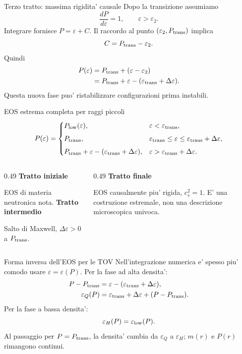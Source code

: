 \begin{frame}{Terzo tratto: massima rigidita' causale}
\small
Dopo la transizione assumiamo
\[
\frac{dP}{d\varepsilon}=1,
\qquad \varepsilon>\varepsilon_2.
\]
Integrare fornisce $P=\varepsilon+C$. Il raccordo al punto $(\varepsilon_2,P_{\rm trans})$ implica
\[
C=P_{\rm trans}-\varepsilon_2.
\]
Quindi
\[
\begin{aligned}
P(\varepsilon)
&=P_{\rm trans}+(\varepsilon-\varepsilon_2)\\
&=P_{\rm trans}+\varepsilon
  -(\varepsilon_{\rm trans}+\Delta\varepsilon).
\end{aligned}
\]
Questa nuova fase puo' ristabilizzare configurazioni prima instabili.
\end{frame}

\begin{frame}{EOS estrema completa per raggi piccoli}
\footnotesize
\[
P(\varepsilon)=
\begin{cases}
P_{\rm low}(\varepsilon),
  &\varepsilon<\varepsilon_{\rm trans},\\[1.5mm]
P_{\rm trans},
  &\varepsilon_{\rm trans}\leq\varepsilon\leq
  \varepsilon_{\rm trans}+\Delta\varepsilon,\\[1.5mm]
P_{\rm trans}+\varepsilon-
  (\varepsilon_{\rm trans}+\Delta\varepsilon),
  &\varepsilon>\varepsilon_{\rm trans}+\Delta\varepsilon.
\end{cases}
\]
\medskip
\begin{columns}[T,onlytextwidth]
\begin{column}{0.49\textwidth}
\textbf{Tratto iniziale}\par\smallskip
EOS di materia neutronica nota.
\medskip
\textbf{Tratto intermedio}\par\smallskip
Salto di Maxwell, $\Delta\varepsilon>0$ a $P_{\rm trans}$.
\end{column}
\begin{column}{0.49\textwidth}
\textbf{Tratto finale}\par\smallskip
EOS causalmente piu' rigida, $c_s^2=1$.
\medskip
E' una costruzione estremale, non una descrizione microscopica univoca.
\end{column}
\end{columns}
\end{frame}

\begin{frame}{Forma inversa dell'EOS per le TOV}
\small
Nell'integrazione numerica e' spesso piu' comodo usare $\varepsilon=\varepsilon(P)$.
\medskip
Per la fase ad alta densita':
\[
\begin{aligned}
P-P_{\rm trans}
&=\varepsilon-(\varepsilon_{\rm trans}+\Delta\varepsilon),\\
\varepsilon_Q(P)
&=\varepsilon_{\rm trans}+\Delta\varepsilon
  +(P-P_{\rm trans}).
\end{aligned}
\]
Per la fase a bassa densita':
\[
\varepsilon_H(P)=\varepsilon_{\rm low}(P).
\]
Al passaggio per $P=P_{\rm trans}$, la densita' cambia da $\varepsilon_Q$ a $\varepsilon_H$; $m(r)$ e $P(r)$ rimangono continui.
\end{frame}

